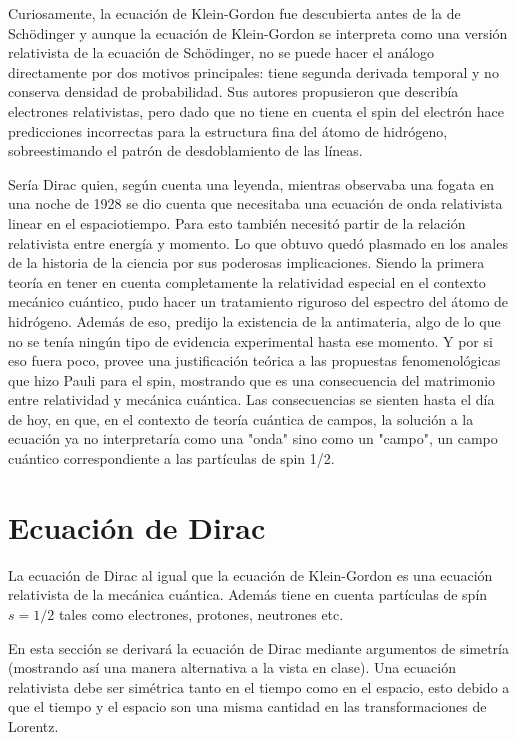 \documentclass[a4paper, 12pt]{article} %
\begin{document}
Curiosamente, la ecuaci\'on de Klein-Gordon fue descubierta antes de la de  Sch\"odinger y aunque la ecuaci\'on de Klein-Gordon se interpreta como una versi\'on relativista de la ecuaci\'on de Sch\"odinger, no se puede hacer el an\'alogo directamente por dos motivos principales: tiene segunda derivada temporal y no conserva densidad de probabilidad. Sus autores propusieron que describ\'ia electrones relativistas, pero dado que no tiene en cuenta el spin del electr\'on hace predicciones incorrectas para la estructura fina del \'atomo de hidr\'ogeno, sobreestimando el patr\'on de desdoblamiento de las l\'ineas.

Ser\'ia Dirac quien, seg\'un cuenta una leyenda, mientras observaba una fogata en una noche de 1928 se dio cuenta que necesitaba una ecuaci\'on de onda relativista linear en el espaciotiempo. Para esto tambi\'en necesit\'o partir de la relaci\'on relativista entre energ\'ia y momento. Lo que obtuvo qued\'o plasmado en los anales de la historia de la ciencia por sus poderosas implicaciones. Siendo la primera teor\'ia en tener en cuenta completamente la relatividad especial en el contexto mec\'anico cu\'antico, pudo hacer un tratamiento riguroso del espectro del \'atomo de hidr\'ogeno. Adem\'as de eso, predijo la existencia de la antimateria, algo de lo que no se ten\'ia ning\'un tipo de evidencia experimental hasta ese momento. Y por si eso fuera poco, provee una justificaci\'on te\'orica \cite{QFT, CT} a las propuestas fenomenol\'ogicas que hizo Pauli para el spin, mostrando que es una consecuencia del matrimonio entre relatividad y mec\'anica cu\'antica. Las consecuencias se sienten hasta el d\'ia de hoy, en que, en el contexto de teor\'ia cu\'antica de campos, la soluci\'on a la ecuaci\'on ya no interpretar\'ia como una "onda" sino como un "campo", un campo cu\'antico correspondiente a las part\'iculas de spin 1/2.


\section{Ecuaci\'on de Dirac}
La ecuaci\'on de Dirac al igual que la ecuaci\'on de Klein-Gordon es una 
ecuaci\'on relativista de la mec\'anica cu\'antica. Adem\'as tiene en cuenta
part\'iculas de sp\'in $s=1/2$ tales como electrones, protones, neutrones etc. 

En esta secci\'on se derivar\'a la ecuaci\'on de Dirac mediante argumentos
de simetr\'ia (mostrando as\'i una manera alternativa a la vista en clase). 
Una ecuaci\'on relativista debe ser sim\'etrica tanto en el tiempo como en el 
espacio, esto debido a que el tiempo y el espacio son una misma cantidad 
en las transformaciones de Lorentz.
\end{document}
